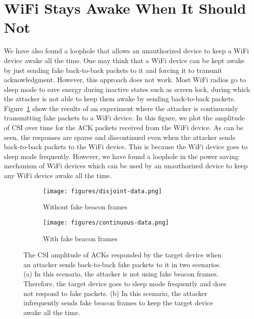 \section{WiFi Stays Awake When It Should Not}
We have also found a loophole that allows an unauthorized device to keep a WiFi device awake all the time. One may think that a WiFi device can be kept awake by just sending fake back-to-back packets to it and forcing it to transmit acknowledgment. However, this approach does not work. Most WiFi radios go to sleep mode to save energy during inactive states such as screen lock, during which the attacker is not able to keep them awake by sending back-to-back packets. Figure~\ref{fig:dis} show the results of an experiment where the attacker is continuously transmitting fake packets to a WiFi device. In this figure, we plot the amplitude of CSI over time for the ACK packets received from the WiFi device. As can be seen, the responses are sparse and discontinued even when the attacker sends back-to-back packets to the WiFi device. This is because the WiFi device goes to sleep mode frequently. However, we have found a loophole in the power saving mechanism of WiFi devices which can be used by an unauthorized device to keep any WiFi device awake all the time.


\begin{figure}[!ht]
    \centering
    \begin{subfigure}[b]{0.24\textwidth}
        \centering 
        \texttt{[image: figures/disjoint-data.png]}
        \caption{Without fake beacon frames}
        \label{fig:dis}
    \end{subfigure}
    \begin{subfigure}[b]{0.24\textwidth}
        \centering
        \texttt{[image: figures/continuous-data.png]}
        \caption{With fake beacon frames}
        \label{fig:cont}
    \end{subfigure}
    \caption{The CSI amplitude of ACKs responded by the target device when an attacker sends back-to-back fake packets to it in two scenarios. (a) In this scenario, the attacker is not using fake beacon frames. Therefore, the target device goes to sleep mode frequently and does not respond to fake packets. (b) In this scenario, the attacker infrequently sends fake beacon frames to keep the target device awake all the time.}
    \label{fig:time-comp}
\end{figure}


